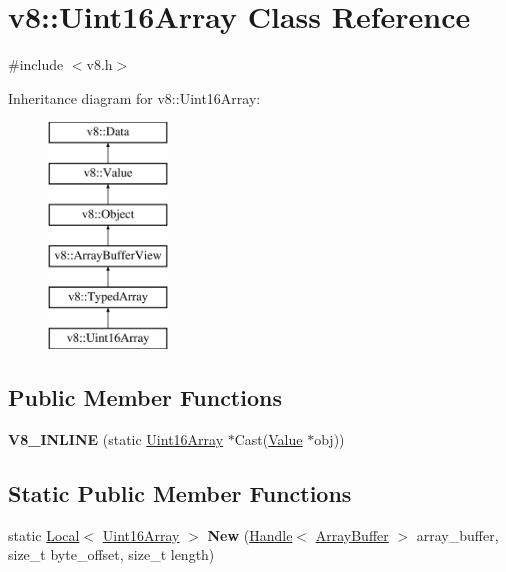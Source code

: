 \hypertarget{classv8_1_1_uint16_array}{}\section{v8\+:\+:Uint16\+Array Class Reference}
\label{classv8_1_1_uint16_array}


{\ttfamily \#include $<$v8.\+h$>$}

Inheritance diagram for v8\+:\+:Uint16\+Array\+:\begin{figure}[H]
\begin{center}
\leavevmode
\includegraphics[height=6.000000cm]{classv8_1_1_uint16_array}
\end{center}
\end{figure}
\subsection*{Public Member Functions}
\begin{DoxyCompactItemize}
\item 
\hypertarget{classv8_1_1_uint16_array_ac8d8dc35bacaf31b59305ce56321de0c}{}{\bfseries V8\+\_\+\+I\+N\+L\+I\+N\+E} (static \hyperlink{classv8_1_1_uint16_array}{Uint16\+Array} $\ast$Cast(\hyperlink{classv8_1_1_value}{Value} $\ast$obj))\label{classv8_1_1_uint16_array_ac8d8dc35bacaf31b59305ce56321de0c}

\end{DoxyCompactItemize}
\subsection*{Static Public Member Functions}
\begin{DoxyCompactItemize}
\item 
\hypertarget{classv8_1_1_uint16_array_a61009e1e8ee6903da33cb95685910270}{}static \hyperlink{classv8_1_1_local}{Local}$<$ \hyperlink{classv8_1_1_uint16_array}{Uint16\+Array} $>$ {\bfseries New} (\hyperlink{classv8_1_1_handle}{Handle}$<$ \hyperlink{classv8_1_1_array_buffer}{Array\+Buffer} $>$ array\+\_\+buffer, size\+\_\+t byte\+\_\+offset, size\+\_\+t length)\label{classv8_1_1_uint16_array_a61009e1e8ee6903da33cb95685910270}

\end{DoxyCompactItemize}
